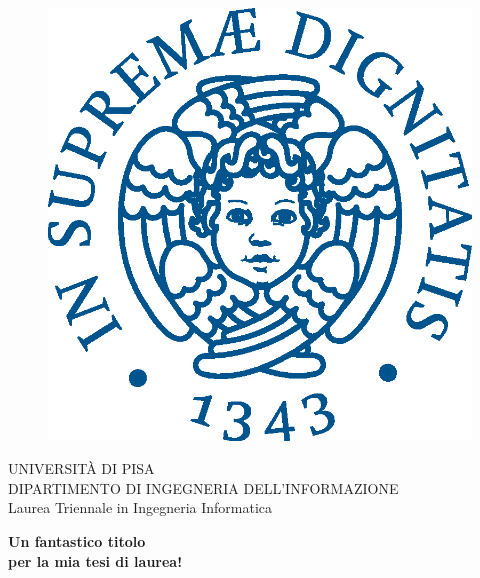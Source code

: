 \begin{titlepage}
    \begin{figure}[!htb]
        \centering
        \includegraphics[keepaspectratio=true,scale=0.5]{images/Frontespizio/cherubinFrontespizio.eps}
    \end{figure}
    
    \begin{center}
        \LARGE{UNIVERSITÀ DI PISA}
        \vspace{5mm}
        \\ \large{DIPARTIMENTO DI INGEGNERIA DELL'INFORMAZIONE}
        \vspace{5mm}
        \\ \LARGE{Laurea Triennale in Ingegneria Informatica}
    \end{center}
    
    \vspace{15mm}
    \begin{center}
        {\LARGE{\bf Un fantastico titolo\\ \vspace{5mm} per la mia tesi di laurea! }}
        
        
    \end{center}
    \vspace{30mm}
    

\end{titlepage}
